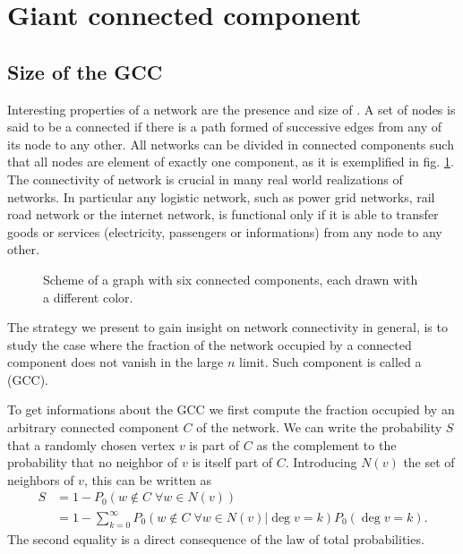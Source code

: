 \documentclass[
11pt, %
american, %
singlespacing, %
final, %
nolistspacing, %
liststotoc, %
headsepline, %
]{MastersDoctoralThesis} %
\begin{document}
\section{Giant connected component}
\label{Section: Giant connected component}

\subsection{Size of the GCC}

Interesting properties of a network are the presence and size of . A set of nodes is said to be a connected if there is a path formed of successive edges from any of its node to any other. All networks can be divided in connected components such that all nodes are element of exactly one component, as it is exemplified in fig. \ref{Figure: Connected components}. The connectivity of network is crucial in many real world realizations of networks. In particular any logistic network, such as power grid networks, rail road network or the internet network, is functional only if it is able to transfer goods or services (electricity, passengers or informations) from any node to any other.

\begin{figure}
	
	\caption{Scheme of a graph with six connected components, each drawn with a different color.}
	\label{Figure: Connected components}
\end{figure}

The strategy we present to gain insight on network connectivity in general, is to study the case where the fraction of the network occupied by a connected component does not vanish in the large $n$ limit. Such component is called a  (GCC).

To get informations about the GCC we first compute the fraction occupied by an arbitrary connected component $C$ of the network. We can write the probability $S$ that a randomly chosen vertex $v$ is part of $C$ as the complement to the probability that no neighbor of $v$ is itself part of $C$. Introducing $N(v)$ the set of neighbors of $v$, this can be written as
\begin{align}
	S 	&= 1 - P_0(w \notin C\; \forall w \in N(v))\\
		&= 1 - \sum_{k=0}^\infty P_0(w \notin C\; \forall w \in N(v)|\deg{v} = k) P_0(\deg{v} = k).
\end{align}
The second equality is a direct consequence of the law of total probabilities.
\end{document}

